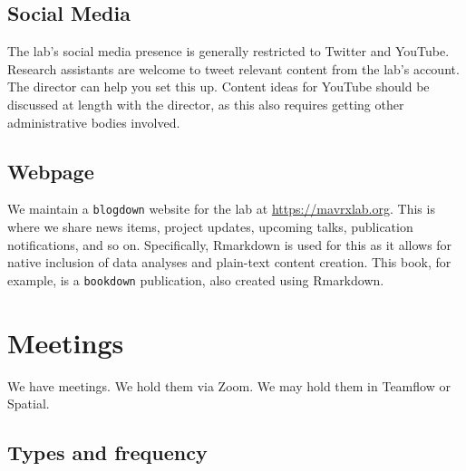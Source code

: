 \documentclass[
]{book}
\begin{document}
\hypertarget{social}{%
\section{Social Media}\label{social}}

The lab's social media presence is generally restricted to Twitter and YouTube. Research assistants are welcome to tweet relevant content from the lab's account. The director can help you set this up. Content ideas for YouTube should be discussed at length with the director, as this also requires getting other administrative bodies involved.

\hypertarget{webpage}{%
\section{Webpage}\label{webpage}}

We maintain a \texttt{blogdown} website for the lab at \url{https://mavrxlab.org}. This is where we share news items, project updates, upcoming talks, publication notifications, and so on. Specifically, Rmarkdown is used for this as it allows for native inclusion of data analyses and plain-text content creation. This book, for example, is a \texttt{bookdown} publication, also created using Rmarkdown.

\hypertarget{meetings}{%
\chapter{Meetings}\label{meetings}}

We have meetings. We hold them via Zoom. We may hold them in Teamflow or Spatial.

\hypertarget{types-and-frequency}{%
\section{Types and frequency}\label{types-and-frequency}}
\end{document}
